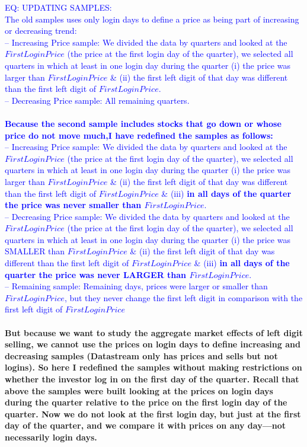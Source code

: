 \textcolor{blue}{EQ: UPDATING SAMPLES: \\ The old samples uses only login days to define a price as being part of increasing or decreasing trend: \\
-- Increasing Price sample: We divided the data by quarters and looked at the $FirstLoginPrice$ (the price at the first login day of the quarter), we selected all quarters in which at least in one login day during the quarter (i) the price was larger than $FirstLoginPrice$ \& (ii) the first left digit of that day was different than the first left digit of $FirstLoginPrice$. \\
-- Decreasing Price sample: All remaining quarters. \\ \\
 \textbf{Because the second sample includes stocks that go down or whose price do not move much,I have redefined the samples as follows:} \\
-- Increasing Price sample: We divided the data by quarters and looked at the $FirstLoginPrice$ (the price at the first login day of the quarter), we selected all quarters in which at least in one login day during the quarter (i) the price was larger than $FirstLoginPrice$ \& (ii) the first left digit of that day was different than the first left digit of $FirstLoginPrice$ \& (iii) \textbf{in all days of the quarter the price was never smaller than $FirstLoginPrice$}. \\
-- Decreasing Price sample: We divided the data by quarters and looked at the $FirstLoginPrice$ (the price at the first login day of the quarter), we selected all quarters in which at least in one login day during the quarter (i) the price was SMALLER than $FirstLoginPrice$ \& (ii) the first left digit of that day was different than the first left digit of $FirstLoginPrice$ \& (iii) \textbf{in all days of the quarter the price was never LARGER than $FirstLoginPrice$}. \\
-- Remaining sample: Remaining days, prices were larger or smaller than $FirstLoginPrice$, but they never change the first left digit in comparison with the first left digit of $FirstLoginPrice$} \\ \\
\textbf{But because we want to study the aggregate market effects of left digit selling, we cannot use the prices on login days to define increasing and decreasing samples (Datastream only has prices and sells but not logins). So here I redefined the samples without making restrictions on whether the investor log in on the first day of the quarter. Recall that above the samples were built looking at the prices on login days during the quarter relative to the price on the first login day of the quarter. Now we do not look at the first login day, but just at the first day of the quarter, and we compare it with prices on any day---not necessarily login days.} \\
